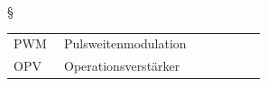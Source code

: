 \documentclass[11pt,a4paper,bibtotoc,oneside]{scrbook}
\begin{document}
\restoregeometry


§

%

\hspace{-17mm}\begin{tabular}{>{\raggedleft}p{0.2\linewidth} p{0.75\linewidth} p{0.1\linewidth}}
PWM & Pulsweitenmodulation \\
OPV & Operationsverstärker
\end{tabular}

%
%
%
\end{document}
